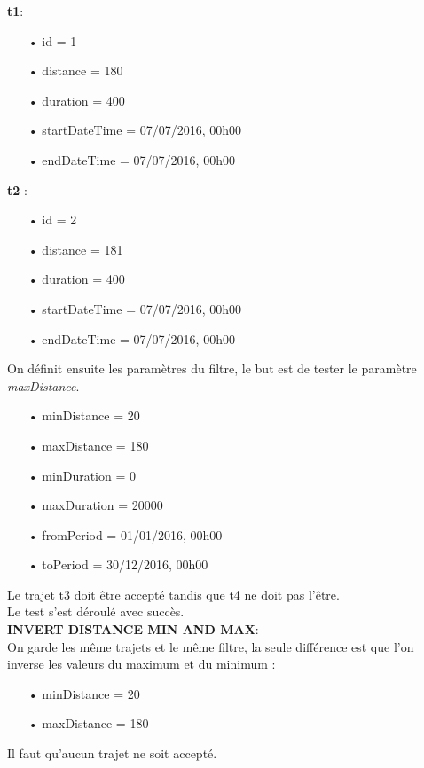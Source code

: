 \documentclass[12pt]{article}
\begin{document}
	\textbf{t1}:\\
	\begin{itemize}
	\item[•] id = 1
	\item[•] distance = 180
	\item[•] duration = 400
	\item[•] startDateTime = 07/07/2016, 00h00
	\item[•] endDateTime = 07/07/2016, 00h00
	\end{itemize}
		
	\textbf{t2} :
	\begin{itemize}
	\item[•] id = 2
	\item[•] distance = 181
	\item[•] duration = 400
	\item[•] startDateTime = 07/07/2016, 00h00
	\item[•] endDateTime = 07/07/2016, 00h00
	\end{itemize}

	On définit ensuite les paramètres du filtre, le but est de tester le paramètre \textit{maxDistance}.
	\begin{itemize}
	\item[•] minDistance = 20
	\item[•] maxDistance = 180
	\item[•] minDuration = 0
	\item[•] maxDuration = 20000
	\item[•] fromPeriod = 01/01/2016, 00h00
	\item[•] toPeriod = 30/12/2016, 00h00
	\end{itemize}

	Le trajet t3 doit être accepté tandis que t4 ne doit pas l’être.\\

	Le test s’est déroulé avec succès.\\


	\textbf{INVERT DISTANCE MIN AND MAX}:\\
	On garde les même trajets et le même filtre, la seule différence est que l’on inverse les valeurs du maximum et du minimum :\\
	\begin{itemize}
	\item[•] minDistance = 20	
	\item[•] maxDistance = 180
	\end{itemize}

	Il faut qu’aucun trajet ne soit accepté. \\
\end{document}
